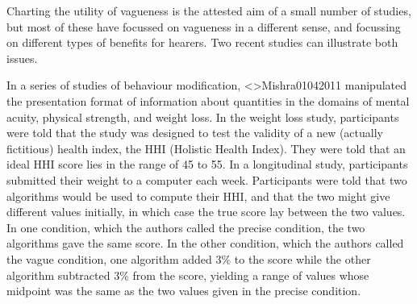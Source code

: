 \documentclass[%
man,		%
floatsintext,%
apacite%
]{apa6}
\begin{document}

Charting the utility of vagueness is the attested aim of a small number of studies, but most of these have focussed on vagueness in a different sense, and focussing on different types of benefits for hearers. Two recent studies can illustrate both issues. 

In a series of studies of behaviour modification, \citeA<>{Mishra01042011} manipulated the presentation format of information about quantities in the domains of mental acuity, physical strength, and weight loss. In the weight loss study, participants were told that the study was designed to test the validity of a new (actually fictitious) health index, the HHI (Holistic Health Index). They were told that an ideal HHI score lies in the range of 45 to 55. In a longitudinal study, participants submitted their weight to a computer each week. Participants were told that two algorithms would be used to compute their HHI, and that the two might give different values initially, in which case the true score lay between the two values. In one condition, which the authors called the precise condition, the two algorithms gave the same score. In the other condition, which the authors called the vague condition, one algorithm added 3\% to the score while the other algorithm subtracted 3\% from the score, yielding a range of values whose midpoint was the same as the two values given in the precise condition. 
\end{document}
